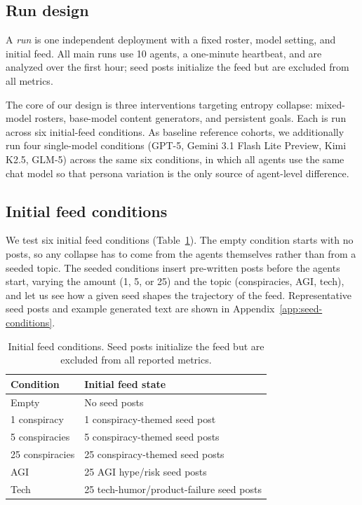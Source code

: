 \documentclass[11pt]{article}
\begin{document}
\subsection{Run design}
\label{subsec:design}

A \emph{run} is one independent deployment with a fixed roster, model setting, and initial feed. All main runs use 10 agents, a one-minute heartbeat, and are analyzed over the first hour; seed posts initialize the feed but are excluded from all metrics.

The core of our design is three interventions targeting entropy collapse: mixed-model rosters, base-model content generators, and persistent goals. Each is run across six initial-feed conditions. As baseline reference cohorts, we additionally run four single-model conditions (GPT-5, Gemini 3.1 Flash Lite Preview, Kimi K2.5, GLM-5) across the same six conditions, in which all agents use the same chat model so that persona variation is the only source of agent-level difference.

\subsection{Initial feed conditions}
\label{subsec:conditions}

We test six initial feed conditions (Table~\ref{tab:feed-conditions}). The empty condition starts with no posts, so any collapse has to come from the agents themselves rather than from a seeded topic. The seeded conditions insert pre-written posts before the agents start, varying the amount (1, 5, or 25) and the topic (conspiracies, AGI, tech), and let us see how a given seed shapes the trajectory of the feed. Representative seed posts and example generated text are shown in Appendix~\ref{app:seed-conditions}.

\begin{table}[t]
\centering
\small
\begin{tabular}{lp{}}
\toprule
Condition & Initial feed state \\
\midrule
Empty & No seed posts \\
1 conspiracy & 1 conspiracy-themed seed post \\
5 conspiracies & 5 conspiracy-themed seed posts \\
25 conspiracies & 25 conspiracy-themed seed posts \\
AGI & 25 AGI hype/risk seed posts \\
Tech & 25 tech-humor/product-failure seed posts \\
\bottomrule
\end{tabular}
\caption{Initial feed conditions. Seed posts initialize the feed but are excluded from all reported metrics.}
\label{tab:feed-conditions}
\end{table}
\end{document}
